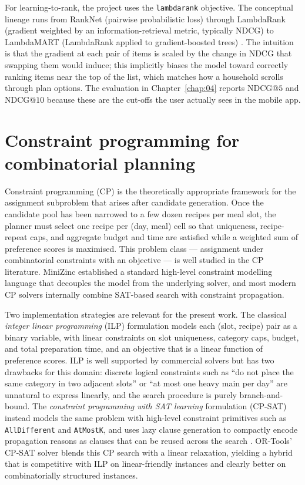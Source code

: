For learning-to-rank, the project uses the \texttt{lambdarank} objective. The conceptual lineage runs from RankNet (pairwise probabilistic loss) through LambdaRank (gradient weighted by an information-retrieval metric, typically NDCG) to LambdaMART (LambdaRank applied to gradient-boosted trees) \cite{burges2010ranknet}. The intuition is that the gradient at each pair of items is scaled by the change in NDCG that swapping them would induce; this implicitly biases the model toward correctly ranking items near the top of the list, which matches how a household scrolls through plan options. The evaluation in Chapter~\ref{chap:04} reports NDCG@$5$ and NDCG@$10$ because these are the cut-offs the user actually sees in the mobile app.

\section{Constraint programming for combinatorial planning}

Constraint programming (CP) is the theoretically appropriate framework for the assignment subproblem that arises after candidate generation. Once the candidate pool has been narrowed to a few dozen recipes per meal slot, the planner must select one recipe per (day, meal) cell so that uniqueness, recipe-repeat caps, and aggregate budget and time are satisfied while a weighted sum of preference scores is maximised. This problem class --- assignment under combinatorial constraints with an objective --- is well studied in the CP literature. MiniZinc \cite{nethercote2007minizinc} established a standard high-level constraint modelling language that decouples the model from the underlying solver, and most modern CP solvers internally combine SAT-based search with constraint propagation.

Two implementation strategies are relevant for the present work. The classical \emph{integer linear programming} (ILP) formulation models each (slot, recipe) pair as a binary variable, with linear constraints on slot uniqueness, category caps, budget, and total preparation time, and an objective that is a linear function of preference scores. ILP is well supported by commercial solvers but has two drawbacks for this domain: discrete logical constraints such as ``do not place the same category in two adjacent slots'' or ``at most one heavy main per day'' are unnatural to express linearly, and the search procedure is purely branch-and-bound. The \emph{constraint programming with SAT learning} formulation (CP-SAT) instead models the same problem with high-level constraint primitives such as \texttt{AllDifferent} and \texttt{AtMostK}, and uses lazy clause generation to compactly encode propagation reasons as clauses that can be reused across the search \cite{ohrimenko2009propagation}. OR-Tools' CP-SAT solver \cite{perron2024ortools,perron2023} blends this CP search with a linear relaxation, yielding a hybrid that is competitive with ILP on linear-friendly instances and clearly better on combinatorially structured instances.

